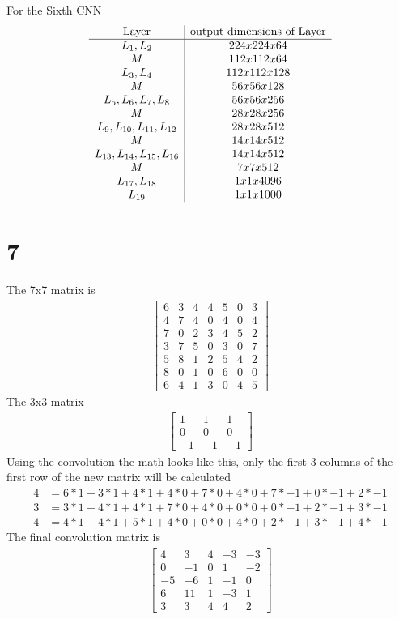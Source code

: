 \documentclass[12pt,english]{article}
\begin{document}
For the Sixth CNN
\begin{equation*}
\begin{array}{c|c}
 \hbox{Layer}& \hbox{output dimensions of Layer}  \\
\hline
L_1,L_2 & 224x224x64 \\
M & 112x112x64 \\
L_3,L_4 & 112x112x128 \\
M & 56x56x128 \\
L_5,L_6,L_7, L_8 & 56x56x256 \\
M & 28x28x256\\
L_9,L_{10},L_{11}, L_{12} & 28x28x512 \\
M & 14x14x512\\
L_{13},L_{14},L_{15}, L_{16} & 14x14x512 \\
M & 7x7x512\\
L_{17},L_{18} & 1x1x4096 \\
L_{19} & 1x1x1000 
\end{array} 
\end{equation*}
\section*{7}
The 7x7 matrix is
\begin{align*}
\begin{bmatrix}6&3&4&4&5&0&3\\4&7&4&0&4&0&4\\7&0&2&3&4&5&2\\3&7&5&0&3&0&7\\5&8&1&2&5&4&2\\8&0&1&0&6&0&0\\6&4&1&3&0&4&5\end{bmatrix}
\end{align*}
The 3x3 matrix
\begin{align*}
\begin{bmatrix} 1 & 1 & 1\\ 0 & 0 & 0\\ -1 & -1 & -1\end{bmatrix}
\end{align*}
Using the convolution the math looks like this, only the first 3 columns of the first row of the new matrix will be calculated
\begin{align*}
4 &= 6*1 + 3*1 + 4*1 + 4*0 + 7*0 + 4*0 + 7*-1 + 0*-1 + 2 *-1\\
3 &= 3*1 + 4*1 + 4*1 + 7*0 + 4*0 + 0*0 + 0*-1 + 2*-1 + 3 *-1\\
4 &= 4*1 + 4*1 + 5*1 + 4*0 + 0*0 + 4*0 + 2*-1 + 3*-1 + 4 *-1
\end{align*}
The final convolution matrix is
\begin{align*}
\begin{bmatrix} 4 & 3 & 4 & -3 & -3\\ 0 & -1 & 0 & 1 & -2\\ -5 & -6 & 1 & -1 & 0\\ 6 & 11 & 1 & -3 & 1\\ 3 & 3 & 4 & 4 & 2\end{bmatrix}
\end{align*}
\end{document}
